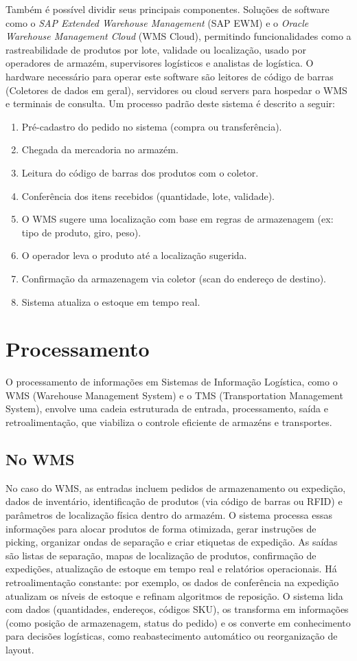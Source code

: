 \documentclass[conference]{IEEEtran}
\begin{document}
Também é possível dividir seus principais componentes. Soluções de software como o \textit{SAP Extended Warehouse Management} (SAP EWM) e o \textit{Oracle Warehouse Management Cloud} (WMS Cloud), permitindo funcionalidades como a rastreabilidade de produtos por lote, validade ou localização, usado por operadores de armazém, supervisores logísticos e analistas de logística. O hardware necessário para operar este software são leitores de código de barras (Coletores de dados em geral), servidores ou cloud servers para hospedar o WMS e terminais de consulta. Um processo padrão deste sistema é descrito a seguir:
\begin{enumerate}
    \item Pré-cadastro do pedido no sistema (compra ou transferência).
    \item Chegada da mercadoria no armazém.
    \item Leitura do código de barras dos produtos com o coletor.
    \item Conferência dos itens recebidos (quantidade, lote, validade).
    \item O WMS sugere uma localização com base em regras de armazenagem (ex: tipo de produto, giro, peso).
    \item O operador leva o produto até a localização sugerida.
    \item Confirmação da armazenagem via coletor (scan do endereço de destino).
    \item Sistema atualiza o estoque em tempo real.
\end{enumerate}
\cite{oracleWMS}\cite{sapWMS}
\section{Processamento}
O processamento de informações em Sistemas de Informação Logística, como o WMS (Warehouse Management System) e o TMS (Transportation Management System), envolve uma cadeia estruturada de entrada, processamento, saída e retroalimentação, que viabiliza o controle eficiente de armazéns e transportes.

\subsection{No WMS}
No caso do WMS, as entradas incluem pedidos de armazenamento ou expedição, dados de inventário, identificação de produtos (via código de barras ou RFID) e parâmetros de localização física dentro do armazém. O sistema processa essas informações para alocar produtos de forma otimizada, gerar instruções de picking, organizar ondas de separação e criar etiquetas de expedição. As saídas são listas de separação, mapas de localização de produtos, confirmação de expedições, atualização de estoque em tempo real e relatórios operacionais. Há retroalimentação constante: por exemplo, os dados de conferência na expedição atualizam os níveis de estoque e refinam algoritmos de reposição. O sistema lida com dados (quantidades, endereços, códigos SKU), os transforma em informações (como posição de armazenagem, status do pedido) e os converte em conhecimento para decisões logísticas, como reabastecimento automático ou reorganização de layout.
\end{document}
